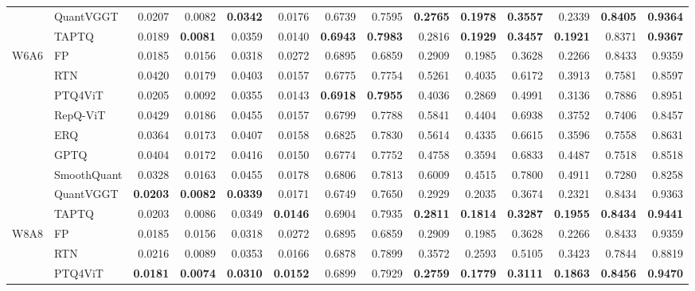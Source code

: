 \documentclass[journal]{Tail_Aware_Post_Training_Quantization_for_3D_Geometry_Models_TMM/IEEEtran}
\newcommand{\taptq}{\textsc{TAPTQ}}
\begin{document}
\begin{table}[t]
\begin{tabular}{@{}cl|rrrrrr|rrrrrr@{}}
& QuantVGGT   & 0.0207 & 0.0082 & \textbf{0.0342} & 0.0176 & 0.6739 & 0.7595 & \textbf{0.2765} & \textbf{0.1978} & \textbf{0.3557} & 0.2339 & \textbf{0.8405} & \textbf{0.9364} \\
\rowcolor{yellow!15}
& \taptq{}    & 0.0189 & \textbf{0.0081} & 0.0359 & 0.0140 & \textbf{0.6943} & \textbf{0.7983} & 0.2816 & \textbf{0.1929} & \textbf{0.3457} & \textbf{0.1921} & 0.8371 & \textbf{0.9367} \\
\midrule
\multirow{9}{*}{W6A6}
& FP          & 0.0185 & 0.0156 & 0.0318 & 0.0272 & 0.6895 & 0.6859 & 0.2909 & 0.1985 & 0.3628 & 0.2266 & 0.8433 & 0.9359 \\
& RTN         & 0.0420 & 0.0179 & 0.0403 & 0.0157 & 0.6775 & 0.7754 & 0.5261 & 0.4035 & 0.6172 & 0.3913 & 0.7581 & 0.8597 \\
& PTQ4ViT     & 0.0205 & 0.0092 & 0.0355 & 0.0143 & \textbf{0.6918} & \textbf{0.7955} & 0.4036 & 0.2869 & 0.4991 & 0.3136 & 0.7886 & 0.8951 \\
& RepQ-ViT    & 0.0429 & 0.0186 & 0.0455 & 0.0157 & 0.6799 & 0.7788 & 0.5841 & 0.4404 & 0.6938 & 0.3752 & 0.7406 & 0.8457 \\
& ERQ         & 0.0364 & 0.0173 & 0.0407 & 0.0158 & 0.6825 & 0.7830 & 0.5614 & 0.4335 & 0.6615 & 0.3596 & 0.7558 & 0.8631 \\
& GPTQ        & 0.0404 & 0.0172 & 0.0416 & 0.0150 & 0.6774 & 0.7752 & 0.4758 & 0.3594 & 0.6833 & 0.4487 & 0.7518 & 0.8518 \\
& SmoothQuant & 0.0328 & 0.0163 & 0.0455 & 0.0178 & 0.6806 & 0.7813 & 0.6009 & 0.4515 & 0.7800 & 0.4911 & 0.7280 & 0.8258 \\
& QuantVGGT   & \textbf{0.0203} & \textbf{0.0082} & \textbf{0.0339} & 0.0171 & 0.6749 & 0.7650 & 0.2929 & 0.2035 & 0.3674 & 0.2321 & 0.8434 & 0.9363 \\
\rowcolor{yellow!15}
& \taptq{}    & 0.0203 & 0.0086 & 0.0349 & \textbf{0.0146} & 0.6904 & 0.7935 & \textbf{0.2811} & \textbf{0.1814} & \textbf{0.3287} & \textbf{0.1955} & \textbf{0.8434} & \textbf{0.9441} \\
\midrule
\multirow{9}{*}{W8A8}
& FP          & 0.0185 & 0.0156 & 0.0318 & 0.0272 & 0.6895 & 0.6859 & 0.2909 & 0.1985 & 0.3628 & 0.2266 & 0.8433 & 0.9359 \\
& RTN         & 0.0216 & 0.0089 & 0.0353 & 0.0166 & 0.6878 & 0.7899 & 0.3572 & 0.2593 & 0.5105 & 0.3423 & 0.7844 & 0.8819 \\
& PTQ4ViT     & \textbf{0.0181} & \textbf{0.0074} & \textbf{0.0310} & \textbf{0.0152} & 0.6899 & 0.7929 & \textbf{0.2759} & \textbf{0.1779} & \textbf{0.3111} & \textbf{0.1863} & \textbf{0.8456} & \textbf{0.9470} \\

\end{tabular}
\end{table}
\end{document}
